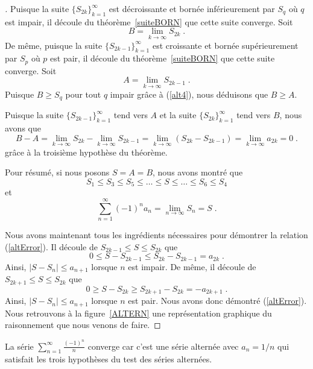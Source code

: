{\begin{proof}[\theory]
Puisque la suite $\{S_{2k}\}_{k=1}^\infty$ est décroissante et bornée
inférieurement par $S_q$ où $q$ est impair, il découle du
théorème~\ref{suiteBORN} que cette suite converge.  Soit
\[
B = \lim_{k\rightarrow \infty} S_{2k} \; .
\]
De même, puisque la suite $\{S_{2k-1}\}_{k=1}^\infty$ est croissante et
bornée supérieurement par $S_p$ où $p$ est pair, il découle du
théorème~\ref{suiteBORN} que cette suite converge.  Soit
\[
A = \lim_{k\rightarrow \infty} S_{2k-1} \; .
\]
Puisque $B \geq S_q$ pour tout $q$ impair grâce à (\ref{alt4}), nous
déduisons que $B \geq A$.

Puisque la suite $\{S_{2k-1}\}_{k=1}^\infty$ tend vers $A$ et la
suite $\{S_{2k}\}_{k=1}^\infty$ tend vers $B$, nous avons que
\[
B-A = \lim_{k\rightarrow \infty} S_{2k} - \lim_{k\rightarrow \infty} S_{2k-1}
= \lim_{k\rightarrow \infty} \left( S_{2k} - S_{2k-1} \right)
= \lim_{k\rightarrow \infty} a_{2k} =0 \; .
\]
grâce à la troisième hypothèse du théorème.

Pour résumé, si nous posons $S=A=B$, nous avons montré que
\[
S_1 \leq S_3 \leq S_5 \leq \ldots \leq S \leq \ldots \leq S_6 \leq S_4
\]
et
\[
\sum_{n=1}^\infty (-1)^n a_n = \lim_{n\rightarrow \infty} S_n = S \; .
\]

Nous avons maintenant tous les ingrédients nécessaires pour démontrer la
relation (\ref{altError}).  Il découle de $S_{2k-1} \leq S \leq S_{2k}$
que
\[
0 \leq S - S_{2k-1} \leq S_{2k} - S_{2k-1} = a_{2k} \; .
\]
Ainsi, $|S- S_n| \leq a_{n+1}$ lorsque $n$ est impair.  De même, il
découle de $S_{2k+1} \leq S \leq S_{2k}$ que
\[
0 \geq S - S_{2k} \geq S_{2k+1} - S_{2k} = -a_{2k+1} \; .
\]
Ainsi, $|S-S_n| \leq a_{n+1}$ lorsque $n$ est pair.  Nous avons donc démontré
(\ref{altError}).  Nous retrouvons à la figure~\ref{ALTERN} une
représentation graphique du raisonnement que nous venons de faire.
\end{proof}


\begin{egg}
La série $\displaystyle \sum_{n=1}^\infty \frac{(-1)^n}{n}$ converge
car c'est une série alternée avec $a_n = 1/n$ qui satisfait les trois
hypothèses du test des séries alternées.
\end{egg}

}
